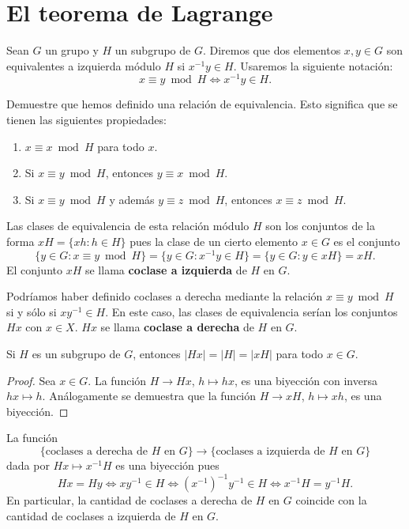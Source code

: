 \chapter{El teorema de Lagrange}

Sean $G$ un grupo y $H$ un subgrupo de $G$. Diremos que dos elementos $x,y\in
G$ son equivalentes a izquierda módulo $H$ si $x^{-1}y\in H$.  Usaremos la siguiente notación:
\[
x\equiv y\bmod
H\Longleftrightarrow x^{-1}y\in H.
\]  

\begin{exercise}
	Demuestre que hemos definido una relación de equivalencia. Esto significa que se tienen las siguientes propiedades:
	\begin{enumerate}
	\item $x\equiv x\bmod H$ para todo $x$.
	\item Si $x\equiv y\bmod H$, entonces $y\equiv x\bmod H$.
	\item Si $x\equiv y\bmod H$ y además $y\equiv z\bmod H$, entonces $x\equiv z\bmod H$.  	
	\end{enumerate}
\end{exercise}

Las clases de equivalencia de esta relación módulo $H$ 
son los conjuntos de la forma $xH=\{xh:h\in H\}$
pues la clase de un cierto elemento $x\in G$ es el conjunto
\[
	\{y\in G:x\equiv y\bmod H\}=\{y\in G:x^{-1}y\in H\}=\{y\in G:y\in xH\}=xH.
\]
El conjunto $xH$ se llama \textbf{coclase a izquierda} de $H$ en $G$. 

Podríamos haber definido coclases a derecha mediante la relación $x\equiv
y\bmod H$ si y sólo si $xy^{-1}\in H$. En este caso, las clases de equivalencia
serían los conjuntos $Hx$ con $x\in X$. $Hx$ se llama \textbf{coclase a derecha}
de $H$ en $G$. 

\begin{proposition}
	Si $H$ es un subgrupo de $G$, entonces $|Hx|=|H|=|xH|$ para todo $x\in G$. 
\end{proposition}

\begin{proof}
	Sea $x\in G$. La función $H\to Hx$, $h\mapsto hx$, es una biyección con
	inversa $hx\mapsto h$. Análogamente se demuestra que la función $H\to xH$,
	$h\mapsto xh$, es una biyección. 
\end{proof}

La función
\[
	\{\text{coclases a derecha de $H$ en $G$}\}\to\{\text{coclases a izquierda de $H$ en $G$}\}
\]
dada por $Hx\mapsto x^{-1}H$ es una biyección pues 
\[
	Hx=Hy
	\Longleftrightarrow xy^{-1}\in H
	\Longleftrightarrow (x^{-1})^{-1}y^{-1}\in H
	\Longleftrightarrow x^{-1}H=y^{-1}H.
\]
En particular, la cantidad de coclases a derecha de $H$ en $G$ coincide con la
cantidad de coclases a izquierda de $H$ en $G$.

